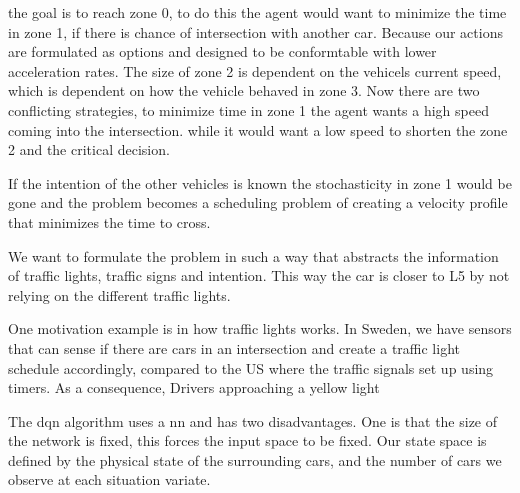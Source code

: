 the goal is to reach zone 0, 
to do this the agent would want to minimize the time in zone 1, if there is chance of intersection with another car.
Because our actions are formulated as options and designed to be conformtable with lower acceleration rates. The size of zone 2 is dependent on the vehicels current speed, which is dependent on how the vehicle behaved in zone 3. 
Now there are two conflicting strategies, to minimize time in zone 1 the agent wants a high speed coming into the intersection. while it would want a low speed to shorten the zone 2 and the critical decision. 

If the intention of the other vehicles is known the stochasticity in zone 1 would be gone and the problem becomes a scheduling problem of creating a velocity profile that minimizes the time to cross.  

We want to formulate the problem in such a way that abstracts the information of traffic lights, traffic signs and intention. This way the car is closer to L5 by not relying on the different traffic lights.

One motivation example is in how traffic lights works. In Sweden, we have sensors that can sense if there are cars in an intersection and create a traffic light schedule accordingly, compared to the US where the traffic signals set up using timers. As a consequence, Drivers approaching a yellow light 

The \gls{dqn} algorithm uses a \gls{nn} and has two disadvantages. One is that the size of the network is fixed, this forces the input space to be fixed. Our state space is defined by the physical state of the surrounding cars, and the number of cars we observe at each situation variate. %

